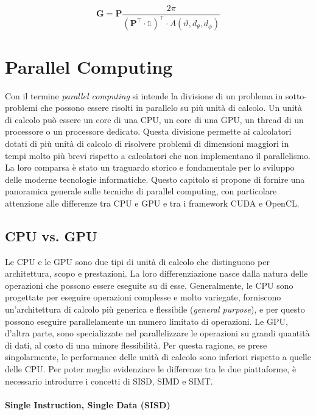 \begin{equation}
  \label{eq:gain}\textbf{G}=\textbf{P}\frac{2\pi}{(\textbf{P}^{\top}\cdot
  \mathds{1})^{\top}\cdot A(\vartheta, d_{\theta}, d_{\phi})}
\end{equation}

\section{Parallel Computing}
\label{sec:parallelcomputing}

Con il termine \textit{parallel computing} si intende la divisione di un problema
in sotto-problemi che possono essere risolti in parallelo su più unità di calcolo.
Un unità di calcolo può essere un core di una CPU, un core di una GPU, un thread
di un processore o un processore dedicato. Questa divisione permette ai calcolatori
dotati di più unità di calcolo di risolvere problemi di dimensioni maggiori in tempi
molto più brevi rispetto a calcolatori che non implementano il parallelismo. La
loro comparsa è stato un traguardo storico e fondamentale per lo sviluppo delle
moderne tecnologie informatiche. Questo capitolo si propone di fornire una panoramica
generale sulle tecniche di parallel computing, con particolare attenzione alle
differenze tra CPU e GPU e tra i framework CUDA e OpenCL.

\subsection{CPU vs. GPU}
\label{subsec:cpuvsgpu}

Le CPU e le GPU sono due tipi di unità di calcolo che distinguono per architettura,
scopo e prestazioni. La loro differenziazione nasce dalla natura delle operazioni
che possono essere eseguite su di esse. Generalmente, le CPU sono progettate per
eseguire operazioni complesse e molto variegate, forniscono un'architettura di
calcolo più generica e flessibile (\textit{general purpose}), e per questo
possono eseguire parallelamente un numero limitato di operazioni. Le GPU, d'altra
parte, sono specializzate nel parallelizzare le operazioni su grandi quantità di
dati, al costo di una minore flessibilità. Per questa ragione, se prese
singolarmente, le performance delle unità di calcolo sono inferiori rispetto a quelle
delle CPU. Per poter meglio evidenziare le differenze tra le due piattaforme, è necessario
introdurre i concetti di SISD, SIMD e SIMT.

\paragraph{Single Instruction, Single Data (SISD)}
\label{para:simd}


